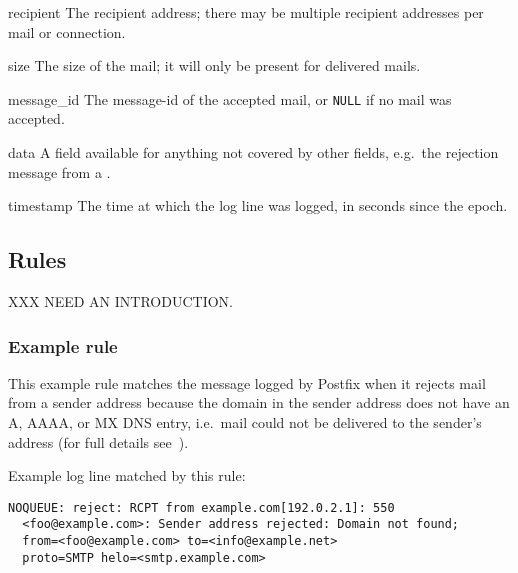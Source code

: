 \begin{eqlist}
    \item [recipient] The recipient address; there may be multiple
        recipient addresses per mail or connection.

    \item [size] The size of the mail; it will only be present for
        delivered mails.

    \item [message\_id] The message-id of the accepted mail, or
        \texttt{NULL} if no mail was accepted.

    \item [data] A field available for anything not covered by other
        fields, e.g.\ the rejection message from a \DNSBL{}\@.

    \item [timestamp] The time at which the log line was logged, in seconds
        since the epoch.

\end{eqlist}



\subsection{Rules}

\label{rules}

XXX NEED AN INTRODUCTION\@.

\subsubsection{Example rule}

\label{example rule}

This example rule matches the message logged by Postfix when it rejects
mail from a sender address because the domain in the sender address does
not have an A, AAAA, or MX DNS entry, i.e.\ mail could not be delivered
to the sender's address (for full details
see~\cite{reject-unknown-sender-domain}).

Example log line matched by this rule:


\begin{verbatim}
NOQUEUE: reject: RCPT from example.com[192.0.2.1]: 550
  <foo@example.com>: Sender address rejected: Domain not found;
  from=<foo@example.com> to=<info@example.net>
  proto=SMTP helo=<smtp.example.com>
\end{verbatim}

